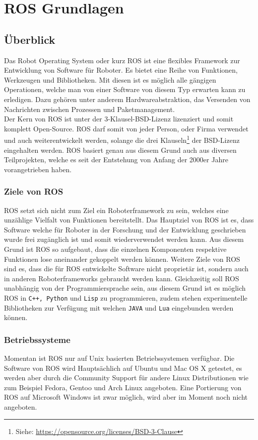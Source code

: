 \chapter{ROS Grundlagen}
\label{sec:TheoretischeGrundlagen}
\section{Überblick}
Das Robot Operating System oder kurz ROS ist eine flexibles Framework zur Entwicklung von Software für Roboter. Es bietet eine Reihe von Funktionen, Werkzeugen und Bibliotheken. Mit diesen ist es möglich alle gängigen Operationen, welche man von einer Software von diesem Typ erwarten kann zu erledigen. Dazu gehören unter anderem Hardwareabstraktion, das Versenden von Nachrichten zwischen Prozessen und Paketmanagement.\cite{ROSIntro6:online}\\
Der Kern von ROS ist unter der 3-Klausel-BSD-Lizenz lizenziert und somit komplett Open-Source. \cite{ROSorgIs25:online} ROS darf somit von jeder Person, oder Firma verwendet und auch weiterentwickelt werden, solange die drei Klauseln\footnote{Siehe: \url{https://opensource.org/licenses/BSD-3-Clause}} der BSD-Lizenz eingehalten werden. ROS basiert genau aus diesem Grund auch aus diversen Teilprojekten, welche es seit der Entstehung von Anfang der 2000er Jahre vorangetrieben haben.\cite{Joseph2015}

\subsection{Ziele von ROS}
ROS setzt sich nicht zum Ziel ein Roboterframework zu sein, welches eine unzählige Vielfalt von Funktionen bereitstellt. Das Hauptziel von ROS ist es, dass Software welche für Roboter in der Forschung und der Entwicklung geschrieben wurde frei zugänglich ist und somit wiederverwendet werden kann. Aus diesem Grund ist ROS so aufgebaut, dass die einzelnen Komponenten respektive Funktionen lose aneinander gekoppelt werden können.
Weitere Ziele von ROS sind es, dass die für ROS entwickelte Software nicht proprietär ist, sondern auch in anderen Roboterframeworks gebraucht werden kann. Gleichzeitig soll ROS unabhängig von der Programmiersprache sein, aus diesem Grund ist es möglich ROS in \verb|C++, Python| und \verb|Lisp| zu programmieren, zudem stehen experimentelle Bibliotheken zur Verfügung mit welchen \verb|JAVA| und \verb|Lua| eingebunden werden können.\cite{Joseph2015}

\subsection{Betriebssysteme}
Momentan ist ROS nur auf Unix basierten Betriebssystemen verfügbar. Die Software von ROS wird Hauptsächlich auf Ubuntu und Mac OS X getestet, es werden aber durch die Community Support für andere Linux Distributionen wie zum Beispiel Fedora, Gentoo und Arch Linux angeboten. Eine Portierung von ROS auf Microsoft Windows ist zwar möglich, wird aber im Moment noch nicht angeboten.\cite{ROSIntro6:online}

